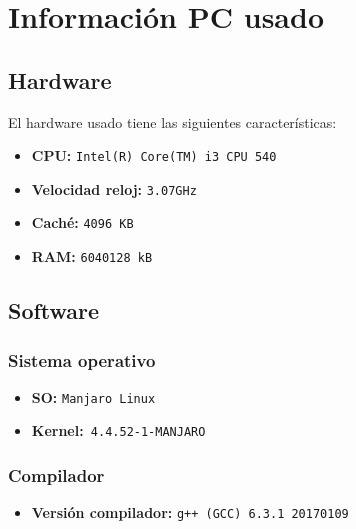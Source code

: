 



\maketitle %
\newpage %
\tableofcontents %
\listoffigures
\newpage


\section{Información PC usado}

\subsection{Hardware}
El hardware usado tiene las siguientes características:
\begin{itemize}
  \item \textbf{CPU:} \texttt{Intel(R) Core(TM) i3 CPU  540}
  \item \textbf{Velocidad reloj:} \texttt{3.07GHz}
  \item \textbf{Caché:} \texttt{4096 KB}
  \item \textbf{RAM:} \texttt{6040128 kB  }
\end{itemize}
\subsection{Software}
\subsubsection{Sistema operativo}
\begin{itemize}
  \item \textbf{SO:} \texttt{Manjaro Linux}
  \item \textbf{Kernel:}\texttt{ 4.4.52-1-MANJARO}
\end{itemize}
\subsubsection{Compilador}
\begin{itemize}
  \item \textbf{Versión compilador:} \texttt{g++ (GCC) 6.3.1 20170109}
\end{itemize}

